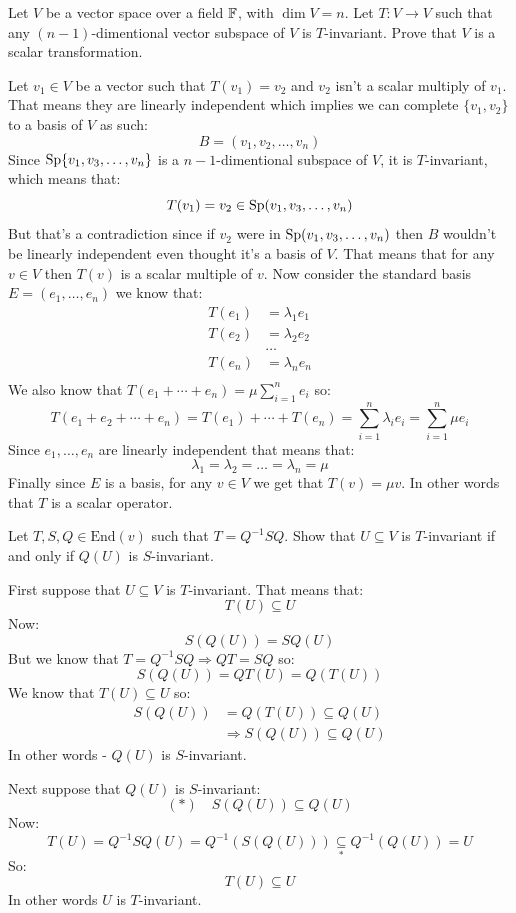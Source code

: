 \documentclass[11pt, a4paper]{article}
\begin{document}
\begin{exercise}
  Let $V$ be a vector space over a field $\mathbb{F}$, with $\dim V = n$. 
  Let $T \colon V \to V$ such that any $(n-1)$-dimentional vector subspace of 
  $V$ is $T$-invariant. Prove that $V$ is a scalar transformation.
\end{exercise}
\begin{solution}
  Let $v_1\in V$ be a vector such that $T(v_1) = v_2$ and $v_2$ isn't a
  scalar multiply of $v_1$. That means they are linearly independent which
  implies we can complete $\{v_1,v_2\}$ to a basis of $V$ as such:
  \[
    B = (v_1,v_2,\dots,v_n)
  \] 
  Since $\mathrm{Sp}\{v_1,v_3,\dots,v_n\}$ is a $n-1$-dimentional subspace of $V$,
  it is $T$-invariant, which means that:
  \[
    T(v_1) = v_2 \in \mathrm{Sp}(v_1,v_3,\dots,v_n)
  \]
  But that's a contradiction since if $v_2$ were in $\mathrm{Sp}(v_1,v_3,\dots,v_n)$
  then $B$ wouldn't be linearly independent even thought it's a basis of $V$.
  That means that for any $v\in V$ then $T(v)$ is a scalar multiple of $v$.
  Now consider the standard basis $E=(e_1,\dots,e_n)$ we know that:
  \begin{align*} 
    T(e_1) &= \lambda_1e_1 \\
    T(e_2) &= \lambda_2e_2 \\
    &\dots \\
    T(e_n) &= \lambda_ne_n \\
  \end{align*}
  We also know that $T(e_1+\cdots+e_n) = \mu\sum_{i=1}^{n}{e_i}$ so:
  \[
    T(e_1+e_2+\cdots+e_n) = T(e_1) + \cdots + T(e_n) = 
    \sum_{i=1}^{n}{\lambda_ie_i} = \sum_{i=1}^{n}{\mu e_i}
  \]
  Since $e_1,\dots,e_n$ are linearly independent that means that:
  \[
    \lambda_1=\lambda_2=\dots=\lambda_n=\mu
  \]
  Finally since $E$ is a basis, for any $v\in V$ we get that $T(v) = \mu v$.
  In other words that $T$ is a scalar operator.
\end{solution}

\begin{exercise}
  Let $T,S,Q\in\text{End}(v)$ such that $T = Q^{-1}SQ$. 
  Show that $U\subseteq V$ is $T$-invariant if and only if $Q(U)$ is 
  $S$-invariant.
\end{exercise}
\begin{solution}
  First suppose that $U\subseteq V$ is $T$-invariant.
  That means that:
  \[
    T(U)\subseteq U
  \]
  Now:
  \[
    S(Q(U)) = SQ(U)
  \]
  But we know that $T = Q^{-1}SQ \Rightarrow QT = SQ$ so:
  \[
    S(Q(U)) = QT(U) = Q(T(U))
  \]
  We know that $T(U)\subseteq U$ so:
  \begin{align*}
    S(Q(U)) &= Q(T(U)) \subseteq Q(U) \\
    &\Rightarrow S(Q(U)) \subseteq Q(U)
  \end{align*}
  In other words - $Q(U)$ is $S$-invariant.

  Next suppose that $Q(U)$ is $S$-invariant:
  \[
    (*) \quad S(Q(U)) \subseteq Q(U)
  \]
  Now:
  \[
    T(U) = Q^{-1}SQ(U) = Q^{-1}(S(Q(U))) \underset{*}{\subseteq} 
    Q^{-1}(Q(U)) = U
  \]
  So:
  \[
    T(U) \subseteq U
  \]
  In other words $U$ is $T$-invariant.
\end{solution}
\end{document}
